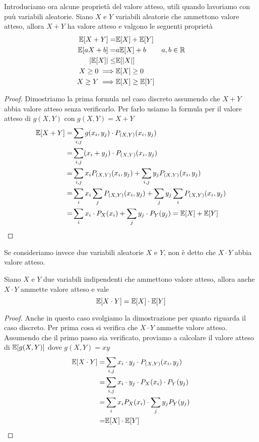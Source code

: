 Introduciamo ora alcune proprietà del valore atteso, utili quando lavoriamo con puù variabili
aleatorie. Siano $X$ e $Y$ variabili aleatorie che ammettono valore atteso, allora $X+Y$ ha valore
atteso e valgono le seguenti proprietà
\begin{align*}
	\mathbb{E}[X+Y] =         & \mathbb{E}[X] + \mathbb{E}[Y]                 \\
	\mathbb{E}[aX + b] =      & a \mathbb{E}[X] + b      & a,b \in \mathbb{R} \\
	|\mathbb{E}[X]| \leq      & \mathbb{E}[|X|]                       \\
	X \geq 0 \implies & \mathbb{E}[X] \geq 0                  \\
	X \geq Y \implies & \mathbb{E}[X] \geq \mathbb{E}[Y]
\end{align*}
\begin{proof}
	Dimostriamo la prima formula nel caso discreto assumendo che $X+Y$ abbia valore atteso
	senza verificarlo. Per farlo usiamo la formula per il valore atteso di $g(X,Y)$ con
	$g(X,Y) = X+Y$
	\begin{align*}
		\mathbb{E}[X+Y] = & \sum_{i,j} g(x_i, y_j) \cdot P_{(X, Y)} (x_i, y_j)                    \\
		=         & \sum_{i,j} (x_i + y_j) \cdot P_{(X,Y)} (x_i, y_j)                     \\
		=         & \sum_{i,j} x_i P_{(X,Y)} (x_i, y_j) +
		\sum_{i,j} y_j P_{(X,Y)} (x_i, y_j)                                               \\
		=         & \sum_i x_i \sum_j P_{(X,Y)} (x_i, y_j) +
		\sum_j y_j \sum_i P_{(X,Y)} (x_i, y_j)                                            \\
		=         & \sum_i x_i \cdot P_X(x_i) + \sum_j y_j \cdot P_Y(y_j) = \mathbb{E}[X] + \mathbb{E}[Y]
	\end{align*}
\end{proof}

Se consideriamo invece due variabili aleatorie $X$ e $Y$, non è detto che $X \cdot Y$ abbia valore
atteso.

\begin{proposition}
	Siano $X$ e $Y$ due variabili indipendenti che ammettono valore atteso, allora anche $X\cdot Y$
	ammette valore atteso e vale
	\[ \mathbb{E}[X \cdot Y] = \mathbb{E}[X] \cdot \mathbb{E}[Y] \]
	\begin{proof}
		Anche in questo caso svolgiamo la dimostrazione per quanto riguarda il caso discreto. Per
		prima cosa si verifica che $X \cdot Y$ ammette valore atteso. Assumendo che il primo passo
		sia verificato, proviamo a calcolare il valore atteso di $\mathbb{E}[g(X,Y)]$ dove $g(X,Y)=xy$
		\begin{align*}
			\mathbb{E}[X \cdot Y] = & \sum_{i,j} x_i \cdot y_j \cdot P_{(X,Y)} (x_i, y_j)    \\
			=               & \sum_{i,j} x_i \cdot y_j \cdot P_X(x_i) \cdot P_Y(y_j) \\
			=               & \sum_i x_i P_X (x_i) \cdot \sum_j y_j P_Y(y_j)         \\
			=               & \mathbb{E}[X] \cdot \mathbb{E}[Y]
		\end{align*}
	\end{proof}
\end{proposition}

